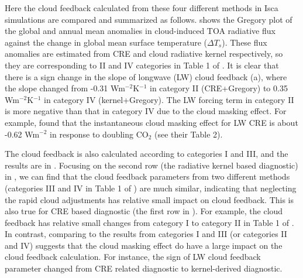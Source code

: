 Here the cloud feedback calculated from these four different methods in Isca simulations are compared and summarized as follows.  shows the Gregory plot of the global and annual mean anomalies in cloud-induced TOA radiative flux against the change in global mean surface temperature ($\Delta T_s$). These flux anomalies are estimated from CRE and cloud radiative kernel respectively, so they are corresponding to II and IV categories in Table 1 of \cite{Zelinka2013}. It is clear that there is a sign change in the slope of longwave (LW) cloud feedback (a), where the slope changed from -0.31 Wm$^{-2}$K$^{-1}$ in category II (CRE+Gregory) to 0.35 Wm$^{-2}$K$^{-1}$ in category IV (kernel+Gregory). The LW forcing term in category II is more negative than that in category IV due to the cloud masking effect. For example, \cite{Andrews2012cloud} found that the instantaneous cloud masking effect for LW CRE is about -0.62 Wm$^{-2}$ in response to doubling CO$_2$ (see their Table 2).


The cloud feedback is also calculated according to categories I and III, and the results are in . Focusing on the second row (the radiative kernel based diagnostic) in , we can find that the cloud feedback parameters from two different methods (categories III and IV in Table 1 of \citealt{Zelinka2013}) are much similar, indicating that neglecting the rapid cloud adjustments has relative small impact on cloud feedback. This is also true for CRE based diagnostic (the first row in ). For example, the cloud feedback has relative small changes from category I to category II in Table 1 of \cite{Zelinka2013}. In contrast, comparing to the results from categories I and III (or categories II and IV) suggests that the cloud masking effect do have a large impact on the cloud feedback calculation. For instance, the sign of LW cloud feedback parameter changed from CRE related diagnostic to kernel-derived diagnostic.

